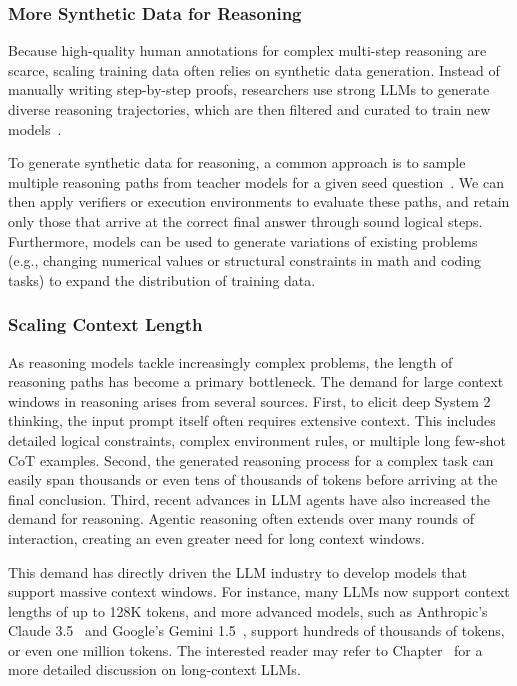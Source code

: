 \subsubsection{More Synthetic Data for Reasoning}

Because high-quality human annotations for complex multi-step reasoning are scarce, scaling training data often relies on synthetic data generation. Instead of manually writing step-by-step proofs, researchers use strong LLMs to generate diverse reasoning trajectories, which are then filtered and curated to train new models~\cite{zelikman-etal:2022star,mukherjee-etal:2023orca}.

To generate synthetic data for reasoning, a common approach is to sample multiple reasoning paths from teacher models for a given seed question~\cite{wang-etal:2023self}. We can then apply verifiers or execution environments to evaluate these paths, and retain only those that arrive at the correct final answer through sound logical steps. Furthermore, models can be used to generate variations of existing problems (e.g., changing numerical values or structural constraints in math and coding tasks) to expand the distribution of training data.

\subsubsection{Scaling Context Length}

As reasoning models tackle increasingly complex problems, the length of reasoning paths has become a primary bottleneck. The demand for large context windows in reasoning arises from several sources. First, to elicit deep System 2 thinking, the input prompt itself often requires extensive context. This includes detailed logical constraints, complex environment rules, or multiple long few-shot CoT examples. Second, the generated reasoning process for a complex task can easily span thousands or even tens of thousands of tokens before arriving at the final conclusion. Third, recent advances in LLM agents have also increased the demand for reasoning. Agentic reasoning often extends over many rounds of interaction, creating an even greater need for long context windows.

This demand has directly driven the LLM industry to develop models that support massive context windows. For instance, many LLMs now support context lengths of up to 128K tokens, and more advanced models, such as Anthropic's Claude 3.5~\cite{anthropic:2024claude35} and Google's Gemini 1.5~\cite{gemini:2024gemini}, support hundreds of thousands of tokens, or even one million tokens. The interested reader may refer to Chapter \ChapterLLM\ for a more detailed discussion on long-context LLMs.

